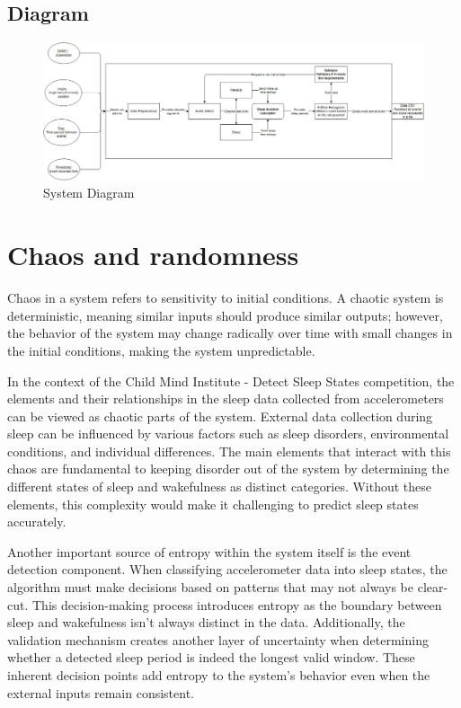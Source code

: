 \documentclass[conference]{IEEEtran}
\begin{document}
\subsection{Diagram}
\begin{figure}[H]
    \centering
    \includegraphics[width=\linewidth]{Workshop-1.JPG}
    \caption{System Diagram}
\end{figure}

\section{Chaos and randomness}
Chaos in a system refers to sensitivity to initial conditions.
A chaotic system is deterministic, meaning similar inputs should produce similar outputs; however,
the behavior of the system may change radically over time with small changes in the initial conditions,
making the system unpredictable.

In the context of the Child Mind Institute - Detect Sleep States competition, the elements and their relationships
in the sleep data collected from accelerometers can be viewed as chaotic parts of the system. External data collection
during sleep can be influenced by various factors such as sleep disorders, environmental conditions, and individual differences.
The main elements that interact with this chaos are fundamental to keeping disorder out of the system by
determining the different states of sleep and wakefulness as distinct categories. Without these elements, this complexity would make it
challenging to predict sleep states accurately.

Another important source of entropy within the system itself is the event detection component. When classifying accelerometer data into sleep states,
the algorithm must make decisions based on patterns that may not always be clear-cut.
This decision-making process introduces entropy as the boundary between sleep and wakefulness isn't always distinct in the data. Additionally,
the validation mechanism creates another layer of uncertainty when determining whether a detected sleep period is indeed the longest valid window.
These inherent decision points add entropy to the system's behavior even when the external inputs remain consistent.
\end{document}
